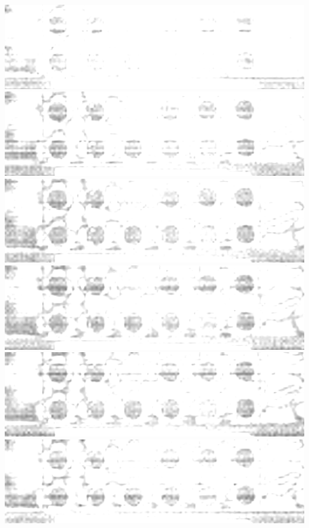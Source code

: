 \documentclass{beamer}
\begin{document}
\begin{frame}
        \includegraphics[height=0.023\textheight]{spatial-denoised/wavelet_den_65.png}
        \includegraphics[height=0.023\textheight]{spatial-denoised/wavelet_den_66.png}
        \includegraphics[height=0.023\textheight]{spatial-denoised/wavelet_den_67.png}
        \includegraphics[height=0.023\textheight]{spatial-denoised/wavelet_den_68.png}
        \includegraphics[height=0.023\textheight]{spatial-denoised/wavelet_den_69.png}
        \includegraphics[height=0.023\textheight]{spatial-denoised/wavelet_den_70.png}

\end{frame}
\end{document}
